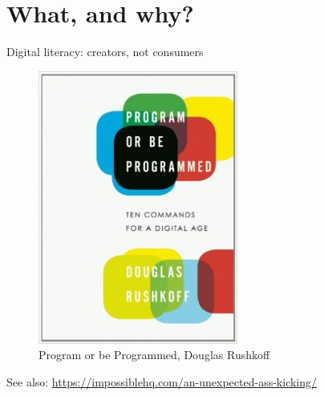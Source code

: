 \documentclass[aspectratio=169, 11pt]{beamer} %
\begin{document}
\section{What, and why?}

\begin{frame}{Digital literacy: creators, not consumers}
    \begin{figure}[H]
        \centering
        \includegraphics[height=.6\textheight]{figures/2011-ProgOrBeProgged-248x340.jpg}
        \caption{Program or be Programmed, Douglas Rushkoff}
        \label{fig:programmed}
    \end{figure}
  
  See also: \url{https://impossiblehq.com/an-unexpected-ass-kicking/}

\end{frame}
\end{document}
